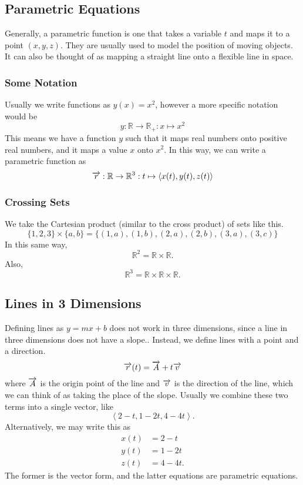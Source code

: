 \documentclass[12pt]{article}
\theoremstyle{plain} %
\theoremstyle{definition}
\theoremstyle{definition}
\theoremstyle{remark}
\newcommand{\vecv}{\vv{v}}
\newcommand{\angled}[1]{\left\langle {#1} \right\rangle}
\newcommand*{\vv}[1]{\overrightarrow{\mkern0mu#1}}
\begin{document}
\subsection{Parametric Equations}
Generally, a parametric function is one that takes a variable $t$ and maps it to a point $(x,y,z)$. They are usually used to model the position of moving objects. It can also be thought of as mapping a straight line onto a flexible line in space.

\subsubsection{Some Notation}
Usually we write functions as $y(x) = x^2$, however a more specific notation would be
\[ y:\mathbb{R} \rightarrow \mathbb{R}_+ : x \mapsto x^2 \]
This means we have a function $y$ such that it maps real numbers onto positive real numbers, and it maps a value $x$ onto $x^2$.
In this way, we can write a parametric function as
\[ \vv{r} : \mathbb{R} \rightarrow \mathbb{R}^3 : t \mapsto  \angled{x(t),y(t),z(t)} \]

\subsubsection{Crossing Sets}
We take the Cartesian product (similar to the cross product) of sets like this.
\[ \{1,2,3\}\times\{a,b\} = \{(1,a),(1,b),(2,a),(2,b),(3,a),(3,c)\} \]
In this same way,
\[ \mathbb{R}^2 = \mathbb{R} \times \mathbb{R} .\]
Also,
\[ \mathbb{R}^3 = \mathbb{R} \times \mathbb{R} \times \mathbb{R} .\]

\subsection{Lines in 3 Dimensions}
Defining lines as $y=mx+b$ does not work in three dimensions, since a line in three dimensions does not have a slope.. Instead, we define lines with a point and a direction.
\[ \vv{r}(t) = \vv{A} + t\vecv \]
where $\vv{A}$ is the origin point of the line and $\vecv$ is the direction of the line, which we can think of as taking the place of the slope. Usually we combine these two terms into a single vector, like
\[ \angled{2-t,1-2t,4-4t} .\]
Alternatively, we may write this as
\begin{align*}
    x(t) & = 2-t \\
    y(t) & = 1-2t \\
    z(t) & = 4-4t.
\end{align*}
The former is the vector form, and the latter equations are parametric equations.
\end{document}
